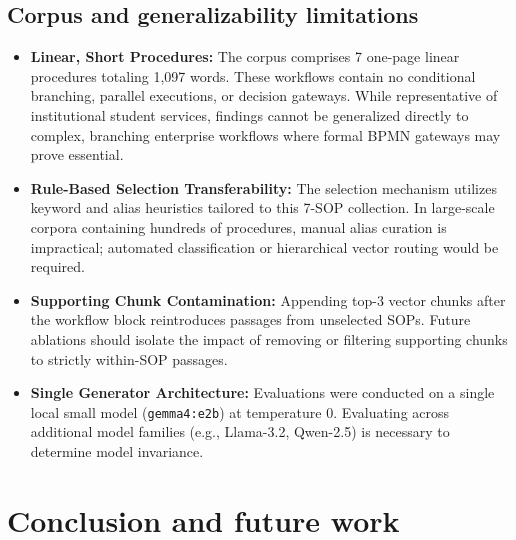 \documentclass[preprint,10pt]{elsarticle}
\begin{document}
\subsection{Corpus and generalizability limitations}
\begin{itemize}[leftmargin=*]
\item \textbf{Linear, Short Procedures:} The corpus comprises 7 one-page linear procedures totaling 1,097 words. These workflows contain no conditional branching, parallel executions, or decision gateways. While representative of institutional student services, findings cannot be generalized directly to complex, branching enterprise workflows where formal BPMN gateways may prove essential.
\item \textbf{Rule-Based Selection Transferability:} The selection mechanism utilizes keyword and alias heuristics tailored to this 7-SOP collection. In large-scale corpora containing hundreds of procedures, manual alias curation is impractical; automated classification or hierarchical vector routing would be required.
\item \textbf{Supporting Chunk Contamination:} Appending top-3 vector chunks after the workflow block reintroduces passages from unselected SOPs. Future ablations should isolate the impact of removing or filtering supporting chunks to strictly within-SOP passages.
\item \textbf{Single Generator Architecture:} Evaluations were conducted on a single local small model (\texttt{gemma4:e2b}) at temperature 0. Evaluating across additional model families (e.g., Llama-3.2, Qwen-2.5) is necessary to determine model invariance.
\end{itemize}

\section{Conclusion and future work}
\label{sec:conclusion}
\end{document}
